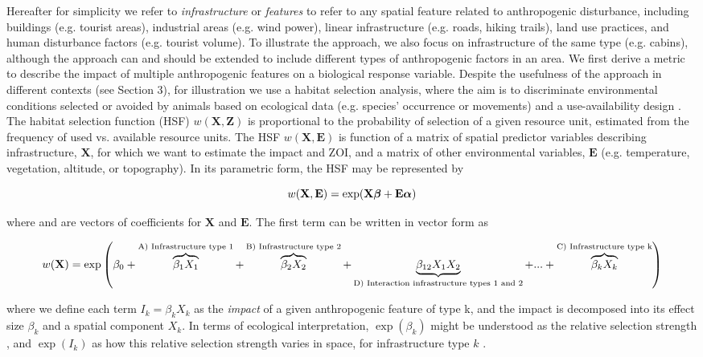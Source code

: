 \documentclass[titlepage]{article}
\begin{document}
Hereafter for simplicity we refer to \textit{infrastructure} or \textit{features} to refer to any spatial feature related to anthropogenic disturbance, including buildings (e.g. tourist areas), industrial areas (e.g. wind power), linear infrastructure (e.g. roads, hiking trails), land use practices, and human disturbance factors (e.g. tourist volume). To illustrate the approach, we also focus on infrastructure of the same type (e.g. cabins), although the approach can and should be extended to include different types of anthropogenic factors in an area. We first derive a metric to describe the impact of multiple anthropogenic features on a biological response variable. Despite the usefulness of the approach in different contexts (see Section 3), for illustration we use a habitat selection analysis, where the aim is to discriminate environmental conditions selected or avoided by animals based on ecological data (e.g. species’ occurrence or movements) and a use-availability design \citep{fieberg_how_2021}. The habitat selection function (HSF) $w(\textbf{X},\textbf{Z})$ is proportional to the probability of selection of a given resource unit, estimated from the frequency of used vs. available resource units. The HSF $w(\textbf{X},\textbf{E})$ is function of a matrix of spatial predictor variables describing infrastructure, $\textbf{X}$, for which we want to estimate the impact and ZOI, and a matrix of other environmental variables, $\textbf{E}$ (e.g. temperature, vegetation, altitude, or topography). In its parametric form, the HSF may be represented by

\begin{equation}
\centering
\label{eqn:HSFgeneral}
    w(\textbf{X},\textbf{E}) = \exp (\textbf{X} \bm{\beta} + \textbf{E} \bm{\alpha})
\end{equation}

where \bm{$\beta$} and \bm{$\alpha$} are vectors of coefficients for $\textbf{X}$ and $\textbf{E}$. The first term can be written in vector form as

\begin{equation}
\centering
\label{eqn:HSF}
    w(\textbf{X}) = \exp \left( \beta_0 + \overbrace{\beta_1 X_1}^\text{A) Infrastructure type 1} + \overbrace{\beta_2 X_2}^\text{B) Infrastructure type 2} + \underbrace{\beta_{12} X_1 X_2}_\text{D) Interaction infrastructure types 1 and 2} + ... + \overbrace{\beta_k X_k}^\text{C) Infrastructure type k} \right)
\end{equation}

where we define each term $I_k = \beta_k X_k$ as the \textit{impact} of a given anthropogenic feature of type k, and the impact is decomposed into its effect size $\beta_k$ and a spatial component $X_k$. In terms of ecological interpretation, $\exp(\beta_k)$ might be understood as the relative selection strength \citep{avgar_relative_2017}, and $\exp(I_k)$ as how this relative selection strength varies in space, for infrastructure type $k$ \citep{fieberg_how_2021}.
\end{document}
